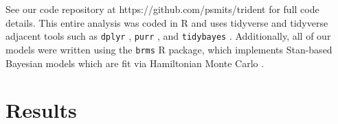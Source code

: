 \documentclass[12pt,letterpaper]{article}
\begin{document}
\begin{refsection}

See our code repository at https://github.com/psmits/trident for full code details. This entire analysis was coded in R and uses tidyverse and tidyverse adjacent tools such as \texttt{dplyr} \citep{dplyr}, \texttt{purr} \citep{purrr}, and \texttt{tidybayes} \citep{tidybayes}. Additionally, all of our models were written using the \texttt{brms} \citep{brms2017,brms2018} R package, which implements Stan-based Bayesian models which are fit via Hamiltonian Monte Carlo \citep{StanManual}.


\section{Results}


\end{refsection}
\end{document}
